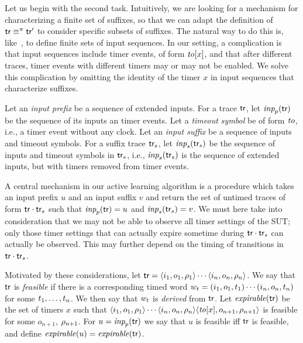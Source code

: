 Let us begin with the second task.
Intuitively, we are looking for a mechanism for characterizing a finite
set of suffixes, so that we can adapt the definition of
$\textsf{tr} \equiv^{\pi} \textsf{tr}'$ to consider specific subsets of
suffixes. The natural way to do this is, like~\cite{Nie03}, to define
finite sets of input sequences. In our setting, a complication is that
input sequences include timer events, of form $\mathit{to}[x]$, and that
after different traces, timer events with different timers may or may
not be enabled. We solve this complication by omitting the
identity of the timer $x$ in input sequences that characterize suffixes.

Let an \emph{input prefix} be a sequence of extended inputs.
For a trace $\textsf{tr}$, let $\textit{inp}_p(\textsf{tr})$ be the sequence of its
inputs an timer events.
Let a \emph{timeout symbol} be of form $\mathit{to}$, i.e., a
timer event without any clock.
Let an \emph{input suffix} be a sequence of inputs and timeout symbols.
For a suffix trace $\textsf{tr}_s$, let $\textit{inp}_s(\textsf{tr}_s)$ be the sequence
of inputs and timeout symbols in $\textsf{tr}_s$, i.e., $\textit{inp}_s(\textsf{tr}_s)$ is the
sequence of extended inputs, but with timers removed from timer events.

A central mechanism in our active learning algorithm is a procedure which
takes  an input prefix $u$ and an input suffix $v$ and return the set of
untimed traces of form $\textsf{tr}\cdot\textsf{tr}_s$ such that
$\textit{inp}_p(\textsf{tr}) = u$ and $\textit{inp}_s(\textsf{tr}_s) = v$. We must here take into
consideration that we may not be able to observe all timer settings of the
SUT; only those timer settings that can actually expire sometime during
$\textsf{tr}\cdot\textsf{tr}_s$ can actually be observed.
This may further depend on the timing of transitions
in $\textsf{tr}\cdot\textsf{tr}_s$.


Motivated by these considerations,
let $\textsf{tr} = \langle i_1,o_1,\rho_1\rangle\cdots\langle i_n,o_n,\rho_n\rangle$.
We say that $\textsf{tr}$ is {\em feasible} if 
there is a corresponding timed word
$w_t = (i_1, o_1, t_1) \cdots (i_n, o_n, t_n)$ for some ${t}_1 , \ldots , {t}_{n}$.
We then say that $w_t$ is {\em derived} from $\textsf{tr}$.
Let $\mathit{expirable}(\textsf{tr})$ be the set of timers $x$ such that
$\langle i_1,o_1,\rho_1\rangle\cdots\langle i_n,o_n,\rho_n\rangle
\langle \mathit{to}[x],o_{n+1},\rho_{n+1}\rangle$
is feasible for some $o_{n+1}$, $\rho_{n+1}$.
For $u = \textit{inp}_p(\textsf{tr})$ we say that $u$ is feasible iff $\textsf{tr}$ is
feasible, and define $\mathit{expirable}(u) = \mathit{expirable}(\textsf{tr})$.

